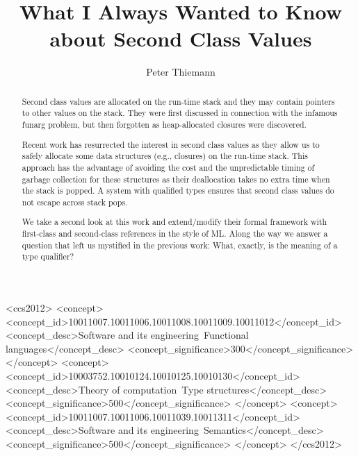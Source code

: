\documentclass[sigplan,dvipsnames,screen]{acmart}
\begin{document}
\title{What I Always Wanted to Know about Second Class Values}

\author{Peter Thiemann}

\begin{abstract}
Second class values are allocated on the run-time stack and they may contain pointers
to other values on the stack. They were first discussed in connection with the
infamous funarg problem, but then forgotten as heap-allocated closures were
discovered.

Recent work has resurrected the interest in second class values as they allow us
to safely allocate some data structures (e.g., closures) on the run-time stack.
This approach has the advantage of avoiding the cost and the
unpredictable timing of garbage collection for
these structures as their deallocation takes no extra time when the
stack is popped. 
A system with qualified types ensures that second class values do not
escape across stack pops.

We take a second look at this work and extend/modify their formal framework
with first-class and second-class references in the style of ML. Along
the way we answer a question that left us mystified in the previous
work:  What, exactly, is the meaning of a type qualifier? 
\end{abstract}

\begin{CCSXML}
<ccs2012>
<concept>
<concept_id>10011007.10011006.10011008.10011009.10011012</concept_id>
<concept_desc>Software and its engineering~Functional languages</concept_desc>
<concept_significance>300</concept_significance>
</concept>
<concept>
<concept_id>10003752.10010124.10010125.10010130</concept_id>
<concept_desc>Theory of computation~Type structures</concept_desc>
<concept_significance>500</concept_significance>
</concept>
<concept>
<concept_id>10011007.10011006.10011039.10011311</concept_id>
<concept_desc>Software and its engineering~Semantics</concept_desc>
<concept_significance>500</concept_significance>
</concept>
</ccs2012>
\end{CCSXML}

\end{document}
